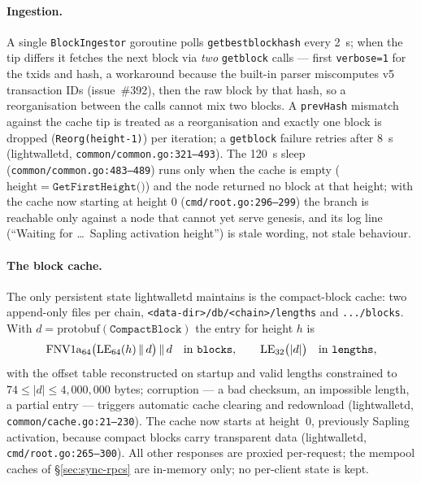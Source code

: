 \documentclass[11pt,a4paper]{article}
\theoremstyle{definition}
\begin{document}
\paragraph{Ingestion.} A single \texttt{BlockIngestor} goroutine polls
\texttt{getbestblockhash} every 2~s; when the tip differs it fetches the
next block via \emph{two} \texttt{getblock} calls --- first
\texttt{verbose=1} for the txids and hash, a workaround because the
built-in parser miscomputes v5 transaction IDs (issue~\#392), then the
raw block by that hash, so a reorganisation between the calls cannot mix
two blocks. A \texttt{prevHash} mismatch against the cache tip is treated
as a reorganisation and exactly one block is dropped
(\texttt{Reorg(height-1)}) per iteration; a \texttt{getblock} failure
retries after 8~s (\textsf{lightwalletd},
\texttt{common/common.go:321--493}). The 120~s sleep
(\texttt{common/common.go:483--489}) runs only when the cache is empty
($\mathrm{height} = \texttt{GetFirstHeight()}$) and the node returned no
block at that height; with the cache now starting at height 0
(\texttt{cmd/root.go:296--299}) the branch is reachable only against a
node that cannot yet serve genesis, and its log line (``Waiting for
\ldots\ Sapling activation height'') is stale wording, not stale
behaviour.

\paragraph{The block cache.} The only persistent state lightwalletd
maintains is the compact-block cache: two append-only files per chain,
\texttt{<data-dir>/db/<chain>/lengths} and \texttt{.../blocks}. With
$d = \mathrm{protobuf}(\mathtt{CompactBlock})$ the entry for height $h$
is
\[
\mathrm{FNV1a}_{64}\bigl(\mathrm{LE}_{64}(h) \,\|\, d\bigr) \,\|\, d
\quad\text{in \texttt{blocks}},\qquad
\mathrm{LE}_{32}\bigl(|d|\bigr) \quad\text{in \texttt{lengths}},
\]
with the offset table reconstructed on startup and valid lengths
constrained to $74 \le |d| \le 4{,}000{,}000$ bytes; corruption --- a bad
checksum, an impossible length, a partial entry --- triggers automatic
cache clearing and redownload (\textsf{lightwalletd},
\texttt{common/cache.go:21--230}). The cache now starts at height~0,
previously Sapling activation, because compact blocks carry transparent
data (\textsf{lightwalletd}, \texttt{cmd/root.go:265--300}). All other
responses are proxied per-request; the mempool caches of
\S\ref{sec:sync-rpcs} are in-memory only; no per-client state is kept.
\end{document}
